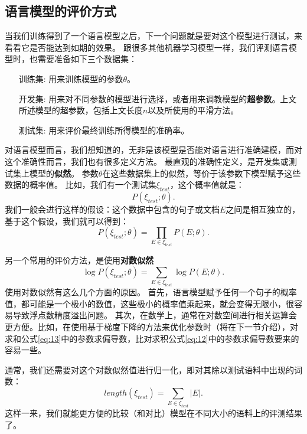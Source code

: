 \documentclass[10pt,a4paper]{ctexart}
\begin{document}
\subsection{语言模型的评价方式}
当我们训练得到了一个语言模型之后，下一个问题就是要对这个模型进行测试，来看看它是否能达到如期的效果。
跟很多其他机器学习模型一样，我们评测语言模型时，也需要准备如下三个数据集：
\begin{enumerate}
\item[训练集:] 用来训练模型的参数$\theta$。
\item[开发集:] 用来对不同参数的模型进行选择，或者用来调教模型的\textbf{超参数}。上文所述模型的超参数，包括上文长度$n$以及所使用的平滑方法。
\item[测试集:] 用来评价最终训练所得模型的准确率。
\end{enumerate}

对语言模型而言，我们想知道的，无非是该模型是否能对语言进行准确建模，而对这个准确性而言，我们也有很多定义方法。
最直观的准确性定义，是开发集或测试集上模型的\textbf{似然}。
参数$\theta$在这些数据集上的似然，等价于该参数下模型赋予这些数据的概率值。
比如，我们有一个测试集$\xi_{test}$，这个概率值就是：
\begin{equation}\label{eq:11}
 P(\xi_{test};\theta).
\end{equation}
我们一般会进行这样的假设：这个数据中包含的句子或文档$E$之间是相互独立的，基于这个假设，我们就可以得到：
\begin{equation}\label{eq:12}
 P(\xi_{test};\theta) = \prod_{E \in \xi_{test}} P(E;\theta).
\end{equation}

另一个常用的评价方法，是使用\textbf{对数似然}
\begin{equation}\label{eq:13}
 \log P(\xi_{test};\theta) = \sum_{E \in \xi_{test}} \log P(E;\theta).
\end{equation}
使用对数似然有这么几个方面的原因。
首先，语言模型赋予任何一个句子的概率值，都可能是一个极小的数值，这些极小的概率值乘起来，就会变得无限小，很容易导致浮点数精度溢出问题。
其次，在数学上，通常在对数空间进行相关运算会更方便。比如，在使用基于梯度下降的方法来优化参数时（将在下一节介绍），对求和公式\ref{eq:13}中的参数求偏导数，比对求积公式\ref{eq:12}中的参数求偏导数要来的容易一些。

通常，我们还需要对这个对数似然值进行归一化，即对其除以测试语料中出现的词数：
\begin{equation}\label{eq:14}
 length(\xi_{test}) = \sum_{E \in \xi_{test}} |E|.
\end{equation}
这样一来，我们就能更方便的比较（和对比）模型在不同大小的语料上的评测结果了。
\end{document}
